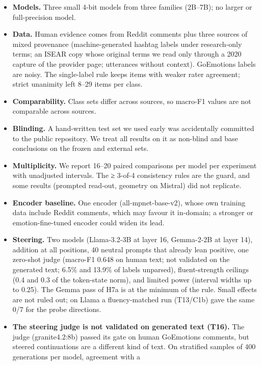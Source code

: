 \documentclass[
  10pt,
]{article}
\providecommand{\tightlist}{%
  \setlength{\itemsep}{0pt}\setlength{\parskip}{0pt}}
\begin{document}
\begin{itemize}
\tightlist
\item
  \textbf{Models.} Three small 4-bit models from three families
  (2B--7B); no larger or full-precision model.
\item
  \textbf{Data.} Human evidence comes from Reddit comments plus three
  sources of mixed provenance (machine-generated hashtag labels under
  research-only terms; an ISEAR copy whose original terms we read only
  through a 2020 capture of the provider page; utterances without
  context). GoEmotions labels are noisy. The single-label rule keeps
  items with weaker rater agreement; strict unanimity left 8--29 items
  per class.
\item
  \textbf{Comparability.} Class sets differ across sources, so macro-F1
  values are not comparable across sources.
\item
  \textbf{Blinding.} A hand-written test set we used early was
  accidentally committed to the public repository. We treat all results
  on it as non-blind and base conclusions on the frozen and external
  sets.
\item
  \textbf{Multiplicity.} We report 16--20 paired comparisons per model
  per experiment with unadjusted intervals. The ≥ 3-of-4 consistency
  rules are the guard, and some results (prompted read-out, geometry on
  Mistral) did not replicate.
\item
  \textbf{Encoder baseline.} One encoder (all-mpnet-base-v2), whose own
  training data include Reddit comments, which may favour it in-domain;
  a stronger or emotion-fine-tuned encoder could widen its lead.
\item
  \textbf{Steering.} Two models (Llama-3.2-3B at layer 16, Gemma-2-2B at
  layer 14), addition at all positions, 40 neutral prompts that already
  lean positive, one zero-shot judge (macro-F1 0.648 on human text; not
  validated on the generated text; 6.5\% and 13.9\% of labels unparsed),
  fluent-strength ceilings (0.4 and 0.3 of the token-state norm), and
  limited power (interval widths up to 0.25). The Gemma pass of H7a is
  at the minimum of the rule. Small effects are not ruled out; on Llama
  a fluency-matched run (T13/C1b) gave the same 0/7 for the probe
  directions.
\item
  \textbf{The steering judge is not validated on generated text (T16).}
  The judge (granite4.2:8b) passed its gate on human GoEmotions
  comments, but steered continuations are a different kind of text. On
  stratified samples of 400 generations per model, agreement with a

\end{itemize}
\end{document}
